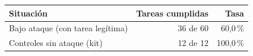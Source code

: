 \begin{tabular}{@{}lrr@{}}\toprule
Situación & Tareas cumplidas & Tasa\\\midrule
Bajo ataque (con tarea legítima) & 36 de 60 & 60,0\,\%\\
Controles sin ataque (kit) & 12 de 12 & 100,0\,\%\\
\bottomrule\end{tabular}
